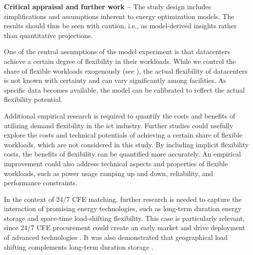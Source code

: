 \textbf{Critical appraisal and further work --} The study design includes simplifications and assumptions inherent to energy optimization models. The results should thus be seen with caution, i.e., as model-derived insights rather than quantitative projections.

One of the central assumptions of the model experiment is that datacenters achieve a certain degree of flexibility in their workloads. While we control the share of flexible workloads exogenously (see ), the actual flexibility of datacenters is not known with certainty and can vary significantly among facilities.
As specific data becomes available, the model can be calibrated to reflect the actual flexibility potential.

Additional empirical research is required to quantify the costs and benefits of utilizing demand flexibility in the \gls{ict} industry.
Further studies could usefully explore the costs and technical potentials of achieving a certain share of flexible workloads, which are not considered in this study.
By including implicit flexibility costs, the benefits of flexibility can be quantified more accurately.
An empirical improvement could also address technical aspects and properties of flexible workloads, such as power usage ramping up and down, reliability, and performance constraints.

In the context of 24/7 CFE matching, further research is needed to capture the interaction of promising energy technologies, such as long-term duration energy storage and space-time load-shifting flexibility.
This case is particularly relevant, since 24/7 CFE procurement could create an early market and drive deployment of advanced technologies \cite{xu-247CFE-report,riepinMeansCostsSystemlevel2023}.
It was also demonstrated that geographical load shifting complements long-term duration storage \cite{riepinValueSpacetimeLoadshifting2023}.
